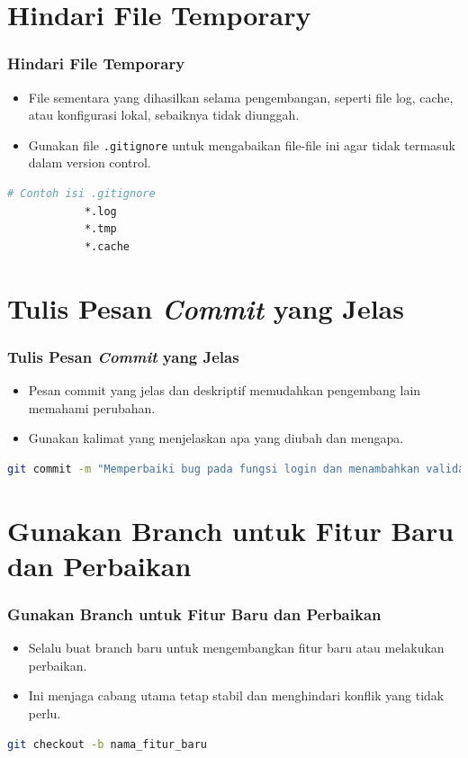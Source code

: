 \documentclass[aspectratio=169, table]{beamer}
\begin{document}
	\section{Hindari File Temporary}
	\begin{frame}[fragile]
		\frametitle{Hindari File Temporary}
		\begin{itemize}
			\item File sementara yang dihasilkan selama pengembangan, seperti file log, cache, atau konfigurasi lokal, sebaiknya tidak diunggah.
			\item Gunakan file \texttt{.gitignore} untuk mengabaikan file-file ini agar tidak termasuk dalam version control.
		\end{itemize}
		\begin{lstlisting}[language=bash]
			# Contoh isi .gitignore
			*.log
			*.tmp
			*.cache
		\end{lstlisting}
	\end{frame}
	
	\section{Tulis Pesan \textit{Commit} yang Jelas}
	\begin{frame}[fragile]
		\frametitle{Tulis Pesan \textit{Commit} yang Jelas}
		\begin{itemize}
			\item Pesan commit yang jelas dan deskriptif memudahkan pengembang lain memahami perubahan.
			\item Gunakan kalimat yang menjelaskan apa yang diubah dan mengapa.
		\end{itemize}
		\begin{lstlisting}[language=bash]
			git commit -m "Memperbaiki bug pada fungsi login dan menambahkan validasi input"
		\end{lstlisting}
	\end{frame}
	
	\section{Gunakan Branch untuk Fitur Baru dan Perbaikan}
	\begin{frame}[fragile]
		\frametitle{\LARGE{Gunakan Branch untuk Fitur Baru dan Perbaikan}}
		\begin{itemize}
			\item Selalu buat branch baru untuk mengembangkan fitur baru atau melakukan perbaikan.
			\item Ini menjaga cabang utama tetap stabil dan menghindari konflik yang tidak perlu.
		\end{itemize}
		\begin{lstlisting}[language=bash]
			git checkout -b nama_fitur_baru
		\end{lstlisting}
	\end{frame}
	
\end{document}
